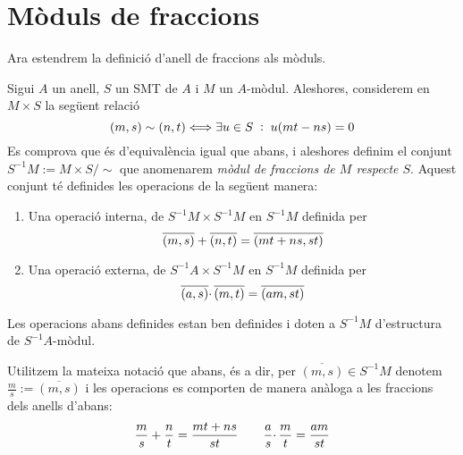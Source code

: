 \documentclass[../../../main.tex]{subfiles}
\begin{document}
\section{Mòduls de fraccions}

Ara estendrem la definició d'anell de fraccions als mòduls.

\begin{defi}
\label{def:modulsDeFraccions} Sigui $A$ un anell, $S$ un SMT de $A$ i $M$ un $A$-mòdul. Aleshores, considerem en $M\times S$ la següent relació
\begin{equation}
    \notag
    (m,s)\sim (n,t)\Longleftrightarrow \exists u\in S\;:\;u(mt-ns) = 0
\end{equation}
Es comprova que és d'equivalència igual que abans, i aleshores definim el conjunt $S^{-1}M:=M\times S/\sim$ que anomenarem \textit{mòdul de fraccions de $M$ respecte $S$}. Aquest conjunt té definides les operacions de la següent manera:
\begin{enumerate}[(1)]
    \item Una operació interna, de $S^{-1}M\times S^{-1}M$ en $S^{-1}M$ definida per 
    \begin{equation}
    \notag
    \overline{(m,s)}+\overline{(n,t)} = \overline{(mt+ns,st)} 
    \end{equation}
    
    \item Una operació externa, de $S^{-1}A\times S^{-1}M$ en $S^{-1}M$ definida per
    \begin{equation}
    \notag
    \overline{(a,s)}\cdotp\overline{(m,t)} = \overline{(am,st)}
    \end{equation}
\end{enumerate}
\end{defi}

\begin{prop}
Les operacions abans definides estan ben definides i doten a $S^{-1}M$ d'estructura de $S^{-1}A$-mòdul.
\end{prop}

\begin{nota}
\label{nota:operacionsModulFraccions} Utilitzem la mateixa notació que abans, és a dir, per $\overline{(m,s)}\in S^{-1}M$ denotem $\frac{m}{s}:=\overline{(m,s)}$ i les operacions es comporten de manera anàloga a les fraccions dels anells d'abans:
\begin{equation}
    \notag
    \frac{m}{s}+\frac{n}{t} = \frac{mt+ns}{st}\qquad \frac{a}{s}\cdotp\frac{m}{t} = \frac{am}{st}
\end{equation}
\end{nota}
\end{document}
